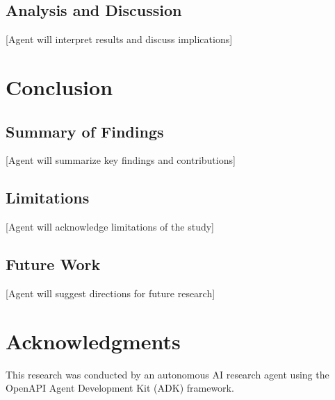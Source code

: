 \documentclass[11pt,a4paper]{article}
\begin{document}
\subsection{Analysis and Discussion}
[Agent will interpret results and discuss implications]

\section{Conclusion}

\subsection{Summary of Findings}
[Agent will summarize key findings and contributions]

\subsection{Limitations}
[Agent will acknowledge limitations of the study]

\subsection{Future Work}
[Agent will suggest directions for future research]

\section{Acknowledgments}
This research was conducted by an autonomous AI research agent using the OpenAPI Agent Development Kit (ADK) framework.

\begin{thebibliography}{99}

\end{thebibliography}
\end{document}
